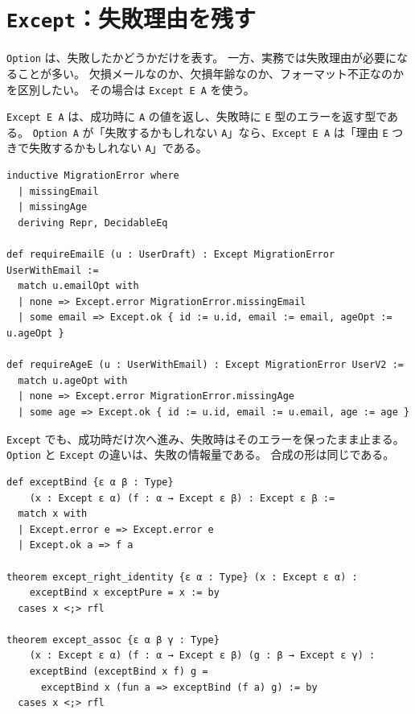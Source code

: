 \section{\texttt{Except}：失敗理由を残す}

\texttt{Option} は、失敗したかどうかだけを表す。
一方、実務では失敗理由が必要になることが多い。
欠損メールなのか、欠損年齢なのか、フォーマット不正なのかを区別したい。
その場合は \texttt{Except E A} を使う。

\begin{definitionbox}
\texttt{Except E A} は、成功時に \texttt{A} の値を返し、失敗時に \texttt{E} 型のエラーを返す型である。
\texttt{Option A} が「失敗するかもしれない \texttt{A}」なら、\texttt{Except E A} は「理由 \texttt{E} つきで失敗するかもしれない \texttt{A}」である。
\end{definitionbox}

\begin{listing}[htbp]
\begin{verbatim}
inductive MigrationError where
  | missingEmail
  | missingAge
  deriving Repr, DecidableEq

def requireEmailE (u : UserDraft) : Except MigrationError UserWithEmail :=
  match u.emailOpt with
  | none => Except.error MigrationError.missingEmail
  | some email => Except.ok { id := u.id, email := email, ageOpt := u.ageOpt }

def requireAgeE (u : UserWithEmail) : Except MigrationError UserV2 :=
  match u.ageOpt with
  | none => Except.error MigrationError.missingAge
  | some age => Except.ok { id := u.id, email := u.email, age := age }
\end{verbatim}
\caption{Except による失敗理由つき移行}
\label{lst:ch11_except}
\end{listing}

\texttt{Except} でも、成功時だけ次へ進み、失敗時はそのエラーを保ったまま止まる。
\texttt{Option} と \texttt{Except} の違いは、失敗の情報量である。
合成の形は同じである。

\begin{listing}[htbp]
\begin{verbatim}
def exceptBind {ε α β : Type}
    (x : Except ε α) (f : α → Except ε β) : Except ε β :=
  match x with
  | Except.error e => Except.error e
  | Except.ok a => f a

theorem except_right_identity {ε α : Type} (x : Except ε α) :
    exceptBind x exceptPure = x := by
  cases x <;> rfl

theorem except_assoc {ε α β γ : Type}
    (x : Except ε α) (f : α → Except ε β) (g : β → Except ε γ) :
    exceptBind (exceptBind x f) g =
      exceptBind x (fun a => exceptBind (f a) g) := by
  cases x <;> rfl
\end{verbatim}
\caption{Except 用の bind とモナド則}
\label{lst:ch11_except_laws}
\end{listing}

